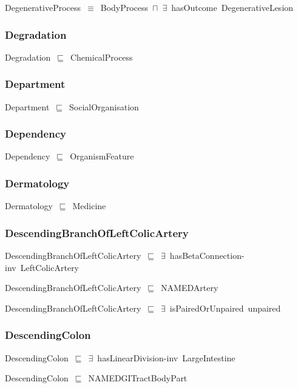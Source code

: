 \documentclass{article}
\begin{document}
DegenerativeProcess~\ensuremath{\equiv}~BodyProcess~\ensuremath{\sqcap}~\ensuremath{\exists}~hasOutcome~DegenerativeLesion

\subsubsection*{Degradation}

Degradation~\ensuremath{\sqsubseteq}~ChemicalProcess~

\subsubsection*{Department}

Department~\ensuremath{\sqsubseteq}~SocialOrganisation~

\subsubsection*{Dependency}

Dependency~\ensuremath{\sqsubseteq}~OrganismFeature~

\subsubsection*{Dermatology}

Dermatology~\ensuremath{\sqsubseteq}~Medicine~

\subsubsection*{DescendingBranchOfLeftColicArtery}

DescendingBranchOfLeftColicArtery~\ensuremath{\sqsubseteq}~\ensuremath{\exists}~hasBetaConnection-inv~LeftColicArtery~

DescendingBranchOfLeftColicArtery~\ensuremath{\sqsubseteq}~NAMEDArtery~

DescendingBranchOfLeftColicArtery~\ensuremath{\sqsubseteq}~\ensuremath{\exists}~isPairedOrUnpaired~unpaired~

\subsubsection*{DescendingColon}

DescendingColon~\ensuremath{\sqsubseteq}~\ensuremath{\exists}~hasLinearDivision-inv~LargeIntestine~

DescendingColon~\ensuremath{\sqsubseteq}~NAMEDGITractBodyPart~
\end{document}
